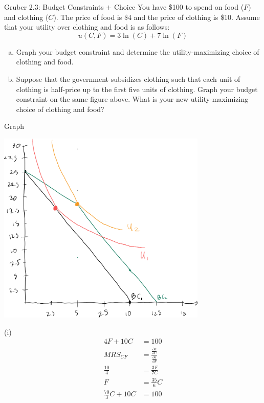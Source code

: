 \documentclass[10pt]{extarticle}
\title{}
\author{Avinash Iyer}
\date{}
\begin{document}
  \begin{problem}{Gruber 2.3: Budget Constraints $+$ Choice}
    You have \$100 to spend on food ($F$) and clothing ($C$). The price of food is \$4 and the price of clothing is \$10. Assume that your utility over clothing and food is as follows:
    \[
      u(C,F) = 3\ln(C) + 7\ln(F)
    \] 
    \begin{enumerate}[(a)]
      \item Graph your budget constraint and determine the utility-maximizing choice of clothing and food.
      \item Suppose that the government subsidizes clothing such that each unit of clothing is half-price up to the first five units of clothing. Graph your budget constraint on the same figure above. What is your new utility-maximizing choice of clothing and food?
    \end{enumerate}
    \tcblower
    \begin{problem}{Graph}
      \begin{center}
        \includegraphics[width=10cm]{1_1}
      \end{center}
    \end{problem}
    \begin{problem}{(i)}
      \begin{align*}
        4F + 10C &= 100 \tag*{budget constraint}\\
        MRS_{CF} &= \frac{\frac{\partial u}{\partial C}}{\frac{\partial u}{\partial F}} \\
        \frac{10}{4}&= \frac{3F}{7C} \\
        F &= \frac{35}{6}C\\
        \frac{70}{3}C + 10C &= 100 \\

\end{align*}
\end{problem}
\end{problem}
\end{document}

